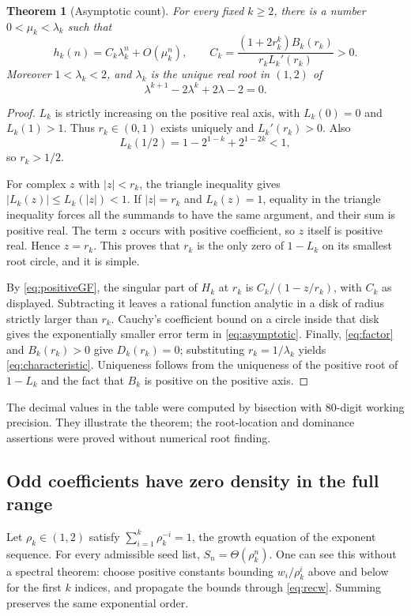 \documentclass[11pt]{article}
\numberwithin{equation}{section}
\newtheorem{theorem}{Theorem}[section]
\theoremstyle{definition}
\theoremstyle{remark}
\begin{document}
\begin{theorem}[Asymptotic count]\label{thm:asymptotic}
For every fixed $k\ge2$, there is a number $0<\mu_k<\lambda_k$ such that
\begin{equation}\label{eq:asymptotic}
 h_k(n)=C_k\lambda_k^n+O(\mu_k^n),
 \qquad
 C_k=\frac{(1+2r_k^k)B_k(r_k)}{r_kL_k'(r_k)}>0.
\end{equation}
Moreover $1<\lambda_k<2$, and $\lambda_k$ is the unique real root
in $(1,2)$ of
\begin{equation}\label{eq:characteristic}
 \lambda^{k+1}-2\lambda^k+2\lambda-2=0.
\end{equation}
\end{theorem}
\begin{proof}
$L_k$ is strictly increasing on the positive real axis, with
$L_k(0)=0$ and $L_k(1)>1$. Thus $r_k\in(0,1)$ exists uniquely and
$L_k'(r_k)>0$. Also
\[
 L_k(1/2)=1-2^{1-k}+2^{1-2k}<1,
\]
so $r_k>1/2$.

For complex $z$ with $|z|<r_k$, the triangle inequality gives
$|L_k(z)|\le L_k(|z|)<1$. If $|z|=r_k$ and $L_k(z)=1$, equality
in the triangle inequality forces all the summands to have the same
argument, and their sum is positive real. The term $z$ occurs with
positive coefficient, so $z$ itself is positive real. Hence $z=r_k$.
This proves that $r_k$ is the only zero of $1-L_k$ on its smallest
root circle, and it is simple.

By \eqref{eq:positiveGF}, the singular part of $H_k$ at $r_k$ is
$C_k/(1-z/r_k)$, with $C_k$ as displayed. Subtracting it leaves a
rational function analytic in a disk of radius strictly larger than
$r_k$. Cauchy's coefficient bound on a circle inside that disk gives
the exponentially smaller error term in \eqref{eq:asymptotic}.
Finally, \eqref{eq:factor} and $B_k(r_k)>0$ give $D_k(r_k)=0$;
substituting $r_k=1/\lambda_k$ yields \eqref{eq:characteristic}.
Uniqueness follows from the uniqueness of the positive root of
$1-L_k$ and the fact that $B_k$ is positive on the positive axis.
\end{proof}


The decimal values in the table were computed by bisection with 80-digit
working precision. They illustrate the theorem; the root-location and
dominance assertions were proved without numerical root finding.

\subsection{Odd coefficients have zero density in the full range}
Let $\rho_k\in(1,2)$ satisfy
$\sum_{i=1}^k\rho_k^{-i}=1$, the growth equation of the exponent sequence.
For every admissible seed list, $S_n=\Theta(\rho_k^n)$. One can see this
without a spectral theorem: choose positive constants bounding
$w_i/\rho_k^i$ above and below for the first $k$ indices, and propagate
the bounds through \eqref{eq:recw}. Summing preserves the same
exponential order.
\end{document}

